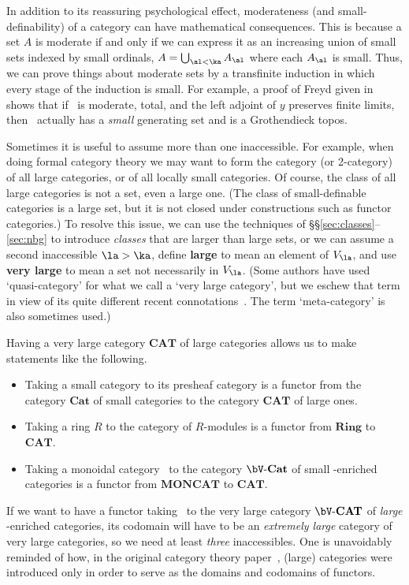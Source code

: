 \documentclass[12pt]{amsart}
\begin{document}
\begin{eg}
  In addition to its reassuring psychological effect, moderateness
  (and small-definability) of a category can have mathematical
  consequences.  This is because a set $A$ is moderate if and only if
  we can express it as an increasing union of small sets indexed by
  small ordinals, $A = \bigcup_{\al<\ka} A_\al$ where each $A_\al$ is
  small.  Thus, we can prove things about moderate sets by a
  transfinite induction in which every stage of the induction is
  small.  For example, a proof of Freyd given in~\cite{street:topos}
  shows that if \bA\ is moderate, total, and the left adjoint of $y$
  preserves finite limits, then \bA\ actually has a \emph{small}
  generating set and is a Grothendieck topos.
\end{eg}

Sometimes it is useful to assume more than one inaccessible.  For
example, when doing formal category theory we may want to form the
category (or 2-category) of all large categories, or of all locally
small categories.  Of course, the class of all large categories is not
a set, even a large one.  (The class of small-definable categories is
a large set, but it is not closed under constructions such as functor
categories.)  To resolve this issue, we can use the techniques of
\S\S\ref{sec:classes}--\ref{sec:nbg} to introduce \emph{classes} that
are larger than large sets, or we can assume a second inaccessible
$\la>\ka$, define \textbf{large} to mean an element of $V_\la$, and
use \textbf{very large} to mean a set not necessarily in $V_\la$.
(Some authors have used `quasi-category' for what we call a `very
large category', but we eschew that term in view of its quite
different recent connotations~\cite{joyal:q_kan}.  The term
`meta-category' is also sometimes used.)

Having a very large category $\mathbf{CAT}$ of large categories allows
us to make statements like the following.
\begin{itemize}
\item Taking a small category to its presheaf category is a functor
  from the category $\mathbf{Cat}$ of small categories to the category
  $\mathbf{CAT}$ of large ones.
\item Taking a ring $R$ to the category of $R$-modules is a functor
  from $\mathbf{Ring}$ to $\mathbf{CAT}$.
\item Taking a monoidal category \bV\ to the category
  $\bV\text{-}\mathbf{Cat}$ of small \bV-enriched categories is a
  functor from $\mathbf{MONCAT}$ to $\mathbf{CAT}$.
\end{itemize}
If we want to have a functor taking \bV\ to the very large category
$\bV\text{-}\mathbf{CAT}$ of \emph{large} \bV-enriched categories, its
codomain will have to be an \emph{extremely large} category of very
large categories, so we need at least \emph{three} inaccessibles.  One
is unavoidably reminded of how, in the original category theory
paper~\cite{em:first-ct}, (large) categories were introduced only in
order to serve as the domains and codomains of functors.
\end{document}

